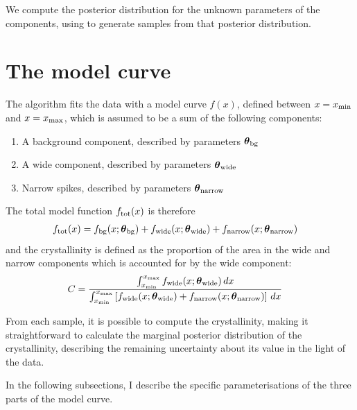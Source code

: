 \documentclass[a4paper, 12pt]{elsarticle}
\newcommand{\params}{\boldsymbol{\theta}}
\newcommand{\x}{x}
\begin{document}
We compute the posterior distribution for the unknown parameters of the
components, using \citep{dnest4} to generate samples from that posterior
distribution.

\section{The model curve}
The algorithm fits the data with a model curve
$f(\x)$, defined between $\x=\x_{\rm min}$ and $\x=\x_{\rm max}$,
which is assumed to be a sum of the following components:
\begin{enumerate}
\item A background component, described by parameters $\params_{\rm bg}$
\item A wide component, described by parameters $\params_{\rm wide}$
\item Narrow spikes, described by parameters $\params_{\rm narrow}$
\end{enumerate}

The total model function $f_{\rm tot}(x)$ is therefore
\begin{align}
f_{\rm tot}(\x) &= f_{\rm bg}(\x; \params_{\rm bg})
       + f_{\rm wide}(\x; \params_{\rm wide})
       + f_{\rm narrow}(\x; \params_{\rm narrow})
\end{align}
and the crystallinity is defined as the proportion of the area in the
wide and narrow components which is accounted for by the wide component:
\begin{align}
C &= \frac{\int_{\x_{\rm min}}^{\x_{\rm max}}
            f_{\rm wide}(\x; \params_{\rm wide}) \, d\x}
          {\int_{\x_{\rm min}}^{\x_{\rm max}}
            \left[f_{\rm wide}(\x; \params_{\rm wide})
            + f_{\rm narrow}(\x; \params_{\rm narrow}) \right] \, d\x}
\end{align}



From each sample,
it is possible to compute the crystallinity, making it straightforward to
calculate the marginal posterior distribution of the crystallinity, describing
the remaining uncertainty about its value in the light of the data.

In the following subsections, I describe the specific parameterisations of the
three parts of the model curve.
\end{document}
